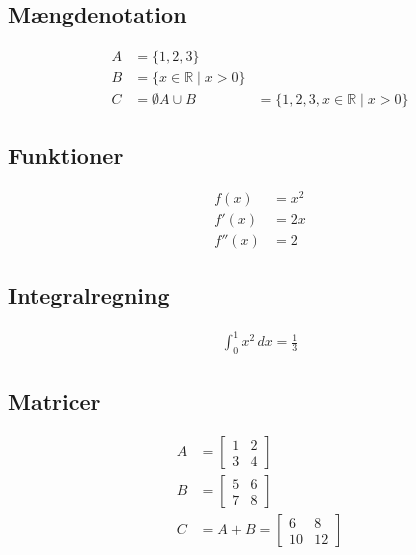 \subsection{Mængdenotation}
\begin{align*}
A &= \{1, 2, 3\} \\
B &= \{x \in \mathbb{R} \mid x > 0\} \\
C &= \emptyset
A \cup B &= \{1, 2, 3, x \in \mathbb{R} \mid x > 0\}
\end{align*}


\subsection{Funktioner}
\begin{align*}
f(x) &= x^2 \\
f'(x) &= 2x \\
f''(x) &= 2
\end{align*}


\subsection{Integralregning}
\begin{align*}
\int_0^1 x^2 \, dx = \frac{1}{3}
\end{align*}


\subsection{Matricer}
\begin{align*}
A &= \begin{bmatrix}
1 & 2 \\
3 & 4
\end{bmatrix} \\
B &= \begin{bmatrix}
5 & 6 \\
7 & 8
\end{bmatrix} \\
C &= A + B = \begin{bmatrix}
6 & 8 \\
10 & 12
\end{bmatrix}
\end{align*}

